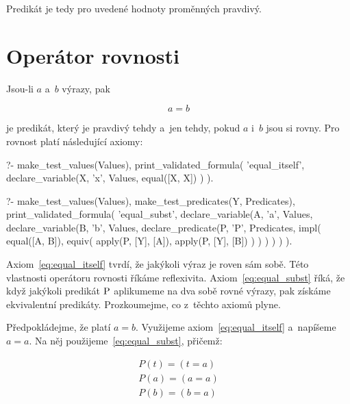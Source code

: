 Predikát je tedy pro uvedené hodnoty proměnných pravdivý.


\section{Operátor rovnosti}
\label{sec:equality_operator}

Jsou-li \(a\) a~\(b\) výrazy, pak

\begin{equation}
a = b
\end{equation}

je predikát, který je pravdivý tehdy a~jen tehdy, pokud \(a\) i~\(b\) jsou si rovny. Pro rovnost platí následující axiomy:

\begin{fact}
\begin{prolog}
?- 	make_test_values(Values),
	print_validated_formula(
		'equal_itself',
		declare_variable(X, 'x', Values,
			equal([X, X])
		)
	).
\end{prolog}
\begin{prolog}
?- 	make_test_values(Values),
	make_test_predicates(Y, Predicates),
	print_validated_formula(
		'equal_subst',
		declare_variable(A, 'a', Values,
			declare_variable(B, 'b', Values,
				declare_predicate(P, 'P', Predicates,
					impl(
						equal([A, B]),
						equiv(
							apply(P, [Y], [A]),
							apply(P, [Y], [B])
						)
					)
				)
			)
		)
	).
\end{prolog}
\end{fact}

Axiom~\eqref{eq:equal_itself} tvrdí, že jakýkoli výraz je roven sám sobě. Této vlastnosti operátoru rovnosti říkáme reflexivita. Axiom~\eqref{eq:equal_subst} říká, že když jakýkoli predikát \(\mathrm{P}\) aplikumeme na dva sobě rovné výrazy, pak získáme ekvivalentní predikáty. Prozkoumejme, co z~těchto axiomů plyne.

Předpokládejme, že platí \(a = b\). Využijeme axiom~\eqref{eq:equal_itself} a~napíšeme \(a = a\). Na něj použijeme~\eqref{eq:equal_subst}, přičemž:

\begin{equation}
\begin{split}
P(t) = (t = a) \\
P(a) = (a = a) \\
P(b) = (b = a)
\end{split}
\end{equation}

